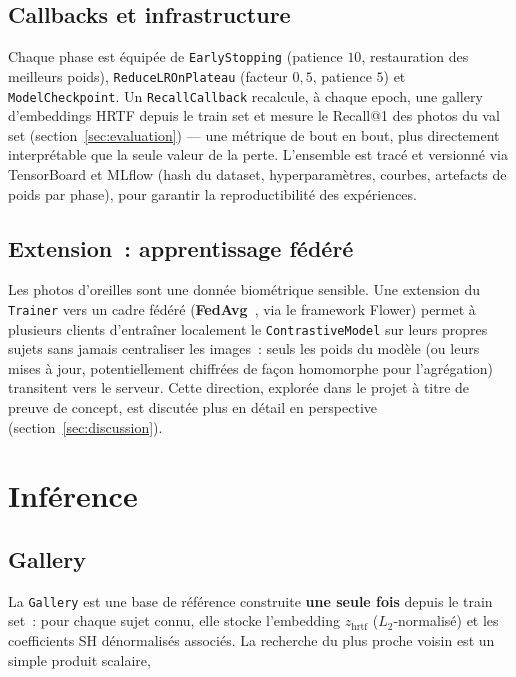 \documentclass[12pt, a4paper]{article}
\begin{document}
\subsection{Callbacks et infrastructure}

Chaque phase est équipée de \texttt{EarlyStopping} (patience $10$,
restauration des meilleurs poids), \texttt{ReduceLROnPlateau} (facteur
$0{,}5$, patience $5$) et \texttt{ModelCheckpoint}. Un
\texttt{RecallCallback} recalcule, à chaque epoch, une gallery
d'embeddings HRTF depuis le train set et mesure le Recall@1 des photos du
val set (section~\ref{sec:evaluation}) — une métrique de bout en bout, plus
directement interprétable que la seule valeur de la perte. L'ensemble est
tracé et versionné via TensorBoard et MLflow (hash du dataset, hyperparamètres,
courbes, artefacts de poids par phase), pour garantir la reproductibilité
des expériences.

\subsection{Extension~: apprentissage fédéré}

Les photos d'oreilles sont une donnée biométrique sensible. Une extension
du \texttt{Trainer} vers un cadre fédéré (\textbf{FedAvg}~\cite{McMahan17},
via le framework Flower) permet à plusieurs clients d'entraîner localement
le \texttt{ContrastiveModel} sur leurs propres sujets sans jamais
centraliser les images~: seuls les poids du modèle (ou leurs mises à jour,
potentiellement chiffrées de façon homomorphe pour l'agrégation) transitent
vers le serveur. Cette direction, explorée dans le projet à titre de preuve
de concept, est discutée plus en détail en perspective (section~\ref{sec:discussion}).

\section{Inférence}
\label{sec:inference}

\subsection{Gallery}

La \texttt{Gallery} est une base de référence construite \textbf{une seule
fois} depuis le train set~: pour chaque sujet connu, elle stocke
l'embedding $z_{\mathrm{hrtf}}$ ($L_2$-normalisé) et les coefficients SH
dénormalisés associés. La recherche du plus proche voisin est un simple
produit scalaire,
\end{document}
